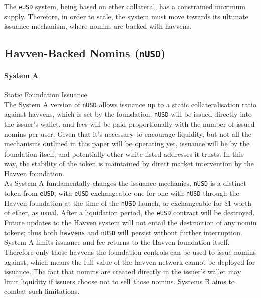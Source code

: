 \noindent The \texttt{eUSD} system, being based on ether collateral, has a constrained
maximum supply. Therefore, in order to scale, the system must move towards its ultimate
issuance mechanism, where nomins are backed with havvens.

\pagebreak
\subsection{Havven-Backed Nomins (\texttt{nUSD})}

\paragraph{System A} Static Foundation Issuance \\

\noindent The System A version of \texttt{nUSD} allows issuance up to a static
collateralisation ratio against havvens, which is set by the foundation.
\texttt{nUSD} will be issued directly into the issuer's wallet, and fees will be paid
proportionally with the number of issued nomins per user. Given that it's necessary to
encourage liquidity, but not all the mechanisms outlined in this paper will be operating
yet, issuance will be by the foundation itself, and potentially other white-listed
addresses it trusts. In this way, the stability of the token is maintained by direct
market intervention by the Havven foundation. \\

\noindent As System A fundamentally changes the issuance mechanics, \texttt{nUSD} is a distinct
token from \texttt{eUSD}, with \texttt{eUSD} exchangeable one-for-one with \texttt{nUSD}
through the Havven foundation at the time of the \texttt{nUSD} launch, or exchangeable
for \$1 worth of ether, as usual. After a liquidation period, the \texttt{eUSD} contract
will be destroyed.
Future updates to the Havven system will not entail the destruction of any nomin tokens; thus
both \texttt{havvens} and \texttt{nUSD} will persist without further interruption. \\

\noindent System A limits issuance and fee returns to the Havven foundation itself. Therefore
only those havvens the foundation controls can be used to issue nomins against, which means
the full value of the havven network cannot be deployed for issuance. The fact that nomins
are created directly in the issuer's wallet may limit liquidity if issuers choose not to sell
those nomins. Systems B aims to combat such limitations. \\


